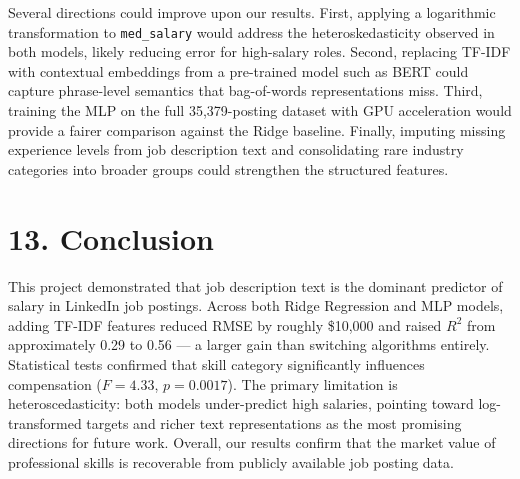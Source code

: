 \documentclass[11pt]{article}
\begin{document}
Several directions could improve upon our results. First, applying a logarithmic transformation to \texttt{med\_salary} would address the heteroskedasticity observed in both models, likely reducing error for high-salary roles. Second, replacing TF-IDF with contextual embeddings from a pre-trained model such as BERT could capture phrase-level semantics that bag-of-words representations miss. Third, training the MLP on the full 35{,}379-posting dataset with GPU acceleration would provide a fairer comparison against the Ridge baseline. Finally, imputing missing experience levels from job description text and consolidating rare industry categories into broader groups could strengthen the structured features.

\section*{13. Conclusion}

This project demonstrated that job description text is the dominant predictor of salary in LinkedIn job postings. Across both Ridge Regression and MLP models, adding TF-IDF features reduced RMSE by roughly \$10{,}000 and raised $R^2$ from approximately 0.29 to 0.56 --- a larger gain than switching algorithms entirely. Statistical tests confirmed that skill category significantly influences compensation ($F = 4.33$, $p = 0.0017$). The primary limitation is heteroscedasticity: both models under-predict high salaries, pointing toward log-transformed targets and richer text representations as the most promising directions for future work. Overall, our results confirm that the market value of professional skills is recoverable from publicly available job posting data.



\end{document}
